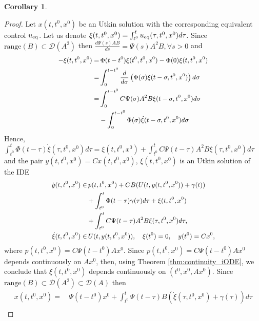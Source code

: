 \documentclass{article}
\newcommand{\D}{\mathcal{D}}
\newcommand{\range}{\mathrm{range}}
\newtheorem{corollary}{Corollary}
\begin{document}
{\begin{corollary}
 	\end{corollary}
 	\begin{proof}
 	Let $x(t,t^0,x^0)$ be  an Utkin solution  with the corresponding equivalent control $u_{\rm eq}$. Let us denote $\xi(t,t^0,x^0)=\int^t_{t^0}u_{\rm eq}(\tau,t^0,x^0) d\tau$. 
 		Since $\range(B)\subset \mathcal{D}(A^2)$ then $\frac{d\Psi(s)AB}{ds}=\Psi(s)A^2B, \forall s> 0$ and
 		\vspace{-1mm}
 		\[\small
 		\begin{split}
 			-\xi(t,t^0,x^0)=&\,\Phi(t-t^0)\xi(t^0,t^0,x^0)-\Phi(0)\xi(t,t^0,x^0)\\
 			=&\int^{t-t^0}_{0} \frac{d}{d\sigma}\left(\Phi(\sigma) \xi(t-\sigma,t^0,x^0)\right)d \sigma\\ =&\int^{t-t^0}_{0}C\Psi(\sigma)A^2B\xi(t-\sigma,t^0,x^0) d\sigma\\
 			&-\int^{t-t^0}_0 \Phi(\sigma) \dot \xi(t-\sigma,t^0,x^0)d \sigma
 		\end{split}\vspace{-1mm}
 		\]
 		Hence, $\int^t_{t^0} \Phi(t-\tau) \dot \xi(\tau,t^0,x^0)d \tau =\xi(t,t^0,x^0)
 		+\int^t_{t^0}C\Psi(t-\tau)A^2B\xi(\tau,t^0,x^0) d\tau$ and
 		the pair $y(t,t^0,x^0)=Cx(t,t^0,x^0)$, $\xi(t,t^0,x^0)$ is an Utkin solution of the  IDE\vspace{-1mm}
 		\[\small
 		\begin{split}
 			\dot y(t,t^0,x^0)\in &\,p(t,t^0,x^0)+CB(U(t,y(t,t^0,x^0))+\gamma(t))\\
 			& + \int^t_{t^0} \Phi(t-\tau) \gamma(\tau )d \tau+\xi(t,t^0,x^0)\\
 			&+\int^t_{t^0}C\Psi(t-\tau)A^2B\xi(\tau,t^0,x^0) d\tau,\\
 			\dot \xi(t,t^0,x^0)\in&\, U(t,y(t,t^0,x^0)), \quad \xi(t^0)=0, \quad y(t^0)=Cx^0,
 		\end{split}\vspace{-1mm}
 		\]
 		where $p(t,t^0,x^0)=C\Psi(t-t^0)Ax^0$.  Since $p(t,t^0,x^0)=C\Psi(t-t^0)Ax^0$ depends continuously on $Ax^0$, then,  using Theorem \ref{thm:continuity_iODE}, 
 		we conclude that $\xi(t,t^0,x^0)$ depends continuously on $(t^0,x^0,Ax^0)$. 
 		Since $\mathrm{range}(B)\!\subset\! \D(A^2)\!\subset\! \D(A)$ then \vspace{-1mm}
 		\[
 		\begin{split}
 		x(t,t^0\!,x^0)\!=\,&\Psi(t\!-\!t^0)x^0\!+\!\!\int^t_{t^0}\!\!\Psi(t\!-\!\tau) B(\dot \xi(\tau,t^0\!,x^0)\!+\!\gamma(\tau))d\tau\\

\end{split}\]
\end{proof}}
\end{document}
